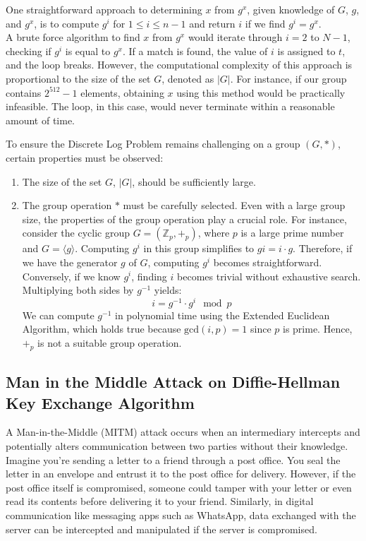 \documentclass[11pt]{article}
\begin{document}
\newline
One straightforward approach to determining \( x \) from \( g^x \), given knowledge of \( G \), \( g \), and \( g^x \), is to compute \( g^i \) for \( 1 \leq i \leq n-1 \) and return \( i \) if we find \( g^i = g^x \).\\
\newline
A brute force algorithm to find \( x \) from \( g^x \) would iterate through \( i = 2 \) to \( N - 1 \), checking if \( g^i \) is equal to \( g^x \). If a match is found, the value of \( i \) is assigned to \( t \), and the loop breaks. However, the computational complexity of this approach is proportional to the size of the set \( G \), denoted as \( |G| \). For instance, if our group contains \( 2^{512} - 1 \) elements, obtaining \( x \) using this method would be practically infeasible. The loop, in this case, would never terminate within a reasonable amount of time.

To ensure the Discrete Log Problem remains challenging on a group \( (G, *) \), certain properties must be observed:

\begin{enumerate}
    \item The size of the set \( G \), \( |G| \), should be sufficiently large.
    \item The group operation \( * \) must be carefully selected. Even with a large group size, the properties of the group operation play a crucial role. For instance, consider the cyclic group \( G = (\mathbb{Z}_p, +_p) \), where \( p \) is a large prime number and \( G = \langle g \rangle \). Computing \( g^i \) in this group simplifies to \( gi = i \cdot g \). Therefore, if we have the generator \( g \) of \( G \), computing \( g^i \) becomes straightforward. Conversely, if we know \( g^i \), finding \( i \) becomes trivial without exhaustive search. Multiplying both sides by \( g^{-1} \) yields:
    \[ i = g^{-1} \cdot g^i \mod p \]
    We can compute \( g^{-1} \) in polynomial time using the Extended Euclidean Algorithm, which holds true because \( \text{gcd}(i, p) = 1 \) since \( p \) is prime. Hence, \( +_p \) is not a suitable group operation.
\end{enumerate}


\subsection{Man in the Middle Attack on Diffie-Hellman Key Exchange Algorithm}

A Man-in-the-Middle (MITM) attack occurs when an intermediary intercepts and potentially alters communication between two parties without their knowledge. Imagine you're sending a letter to a friend through a post office. You seal the letter in an envelope and entrust it to the post office for delivery. However, if the post office itself is compromised, someone could tamper with your letter or even read its contents before delivering it to your friend. Similarly, in digital communication like messaging apps such as WhatsApp, data exchanged with the server can be intercepted and manipulated if the server is compromised.
\end{document}
